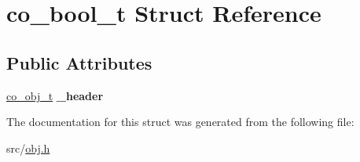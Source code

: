 \hypertarget{structco__bool__t}{\section{co\+\_\+bool\+\_\+t Struct Reference}
\label{structco__bool__t}
}
\subsection*{Public Attributes}
\begin{DoxyCompactItemize}
\item 
\hypertarget{structco__bool__t_ad8cbe3f5722f71480b9640cd8337f87e}{\hyperlink{structco__obj__t}{co\+\_\+obj\+\_\+t} {\bfseries \+\_\+header}}\label{structco__bool__t_ad8cbe3f5722f71480b9640cd8337f87e}

\end{DoxyCompactItemize}


The documentation for this struct was generated from the following file\+:\begin{DoxyCompactItemize}
\item 
src/\hyperlink{obj_8h}{obj.\+h}\end{DoxyCompactItemize}
